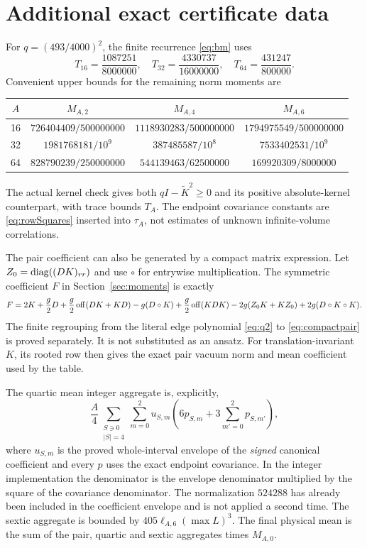 \section{Additional exact certificate data}\label{app:data}
For $q=(493/4000)^2$, the finite recurrence \eqref{eq:bm} uses
\[
 T_{16}=\frac{1087251}{8000000},\quad
 T_{32}=\frac{4330737}{16000000},\quad
 T_{64}=\frac{431247}{800000}.
\]
Convenient upper bounds for the remaining norm moments are
\begin{center}\small
\begin{tabular}{c ccc}\toprule
$A$ & $M_{A,2}$ & $M_{A,4}$ & $M_{A,6}$\\\midrule
16 & $726404409/500000000$ & $1118930283/500000000$ & $1794975549/500000000$\\
32 & $1981768181/10^9$ & $387485587/10^8$ & $7533402531/10^9$\\
64 & $828790239/250000000$ & $544139463/62500000$ & $169920309/8000000$\\\bottomrule
\end{tabular}
\end{center}
The actual kernel check gives both $qI-\widetilde K^2\ge0$ and its positive
absolute-kernel counterpart, with trace bounds $T_A$. The endpoint covariance
constants are \eqref{eq:rowSquares} inserted into $\tau_A$, not estimates of
unknown infinite-volume correlations.

The pair coefficient can also be generated by a compact matrix expression.
Let $Z_0=\operatorname{diag}((DK)_{rr})$ and use $\circ$ for entrywise multiplication. The
symmetric coefficient $F$ in Section~\ref{sec:moments} is exactly
\begin{equation}\label{eq:compactpair}
 F=2K+\frac g2D+\frac g2\operatorname{off}(DK+KD)-g(D\circ K)
 +\frac g2\operatorname{off}(KDK)-2g(Z_0K+KZ_0)+2g(D\circ K\circ K).
\end{equation}
The finite regrouping from the literal edge polynomial \eqref{eq:q2} to
\eqref{eq:compactpair} is proved separately. It is not substituted as an ansatz.
For translation-invariant $K$, its rooted row then gives the exact pair vacuum
norm and mean coefficient used by the table.

The quartic mean integer aggregate is, explicitly,
\[
 \frac A4\sum_{\substack{S\ni0\\|S|=4}}\sum_{m=0}^2
       u_{S,m}\left(6p_{S,m}+3\sum_{m'=0}^2p_{S,m'}\right),
\]
where $u_{S,m}$ is the proved whole-interval envelope of the \emph{signed}
canonical coefficient and every $p$ uses the exact endpoint covariance.
In the integer implementation the denominator is the envelope denominator
multiplied by the square of the covariance denominator. The normalization
$524288$ has already been included in the coefficient envelope and is not
applied a second time. The sextic aggregate is bounded by
$405\ell_{A,6}(\max L)^3$. The final physical mean is the sum of the pair,
quartic and sextic aggregates times $M_{A,0}$.
